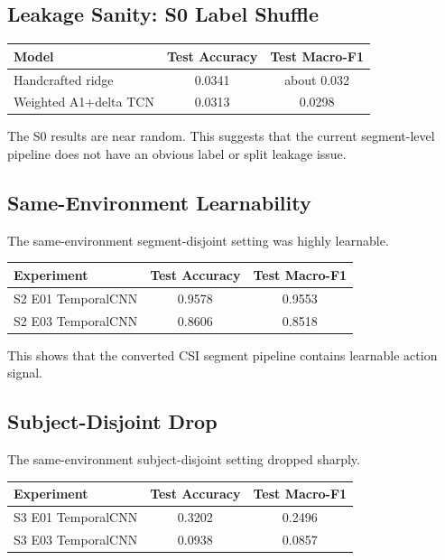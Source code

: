 \documentclass[11pt]{article}
\begin{document}
\subsection{Leakage Sanity: S0 Label Shuffle}

\begin{center}
\begin{tabular}{lcc}
\toprule
Model & Test Accuracy & Test Macro-F1 \\
\midrule
Handcrafted ridge & 0.0341 & about 0.032 \\
Weighted A1+delta TCN & 0.0313 & 0.0298 \\
\bottomrule
\end{tabular}
\end{center}

The S0 results are near random. This suggests that the current segment-level pipeline does not have an obvious label or split leakage issue.

\subsection{Same-Environment Learnability}

The same-environment segment-disjoint setting was highly learnable.

\begin{center}
\begin{tabular}{lcc}
\toprule
Experiment & Test Accuracy & Test Macro-F1 \\
\midrule
S2 E01 TemporalCNN & 0.9578 & 0.9553 \\
S2 E03 TemporalCNN & 0.8606 & 0.8518 \\
\bottomrule
\end{tabular}
\end{center}

This shows that the converted CSI segment pipeline contains learnable action signal.

\subsection{Subject-Disjoint Drop}

The same-environment subject-disjoint setting dropped sharply.

\begin{center}
\begin{tabular}{lcc}
\toprule
Experiment & Test Accuracy & Test Macro-F1 \\
\midrule
S3 E01 TemporalCNN & 0.3202 & 0.2496 \\
S3 E03 TemporalCNN & 0.0938 & 0.0857 \\
\bottomrule
\end{tabular}
\end{center}
\end{document}
